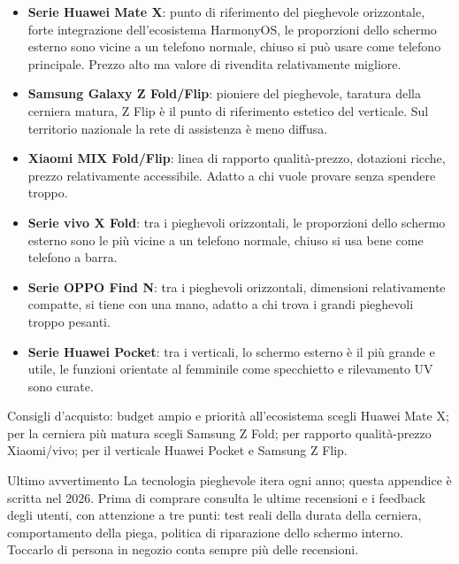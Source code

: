 \begin{itemize}
  \item \textbf{Serie Huawei Mate X}: punto di riferimento del pieghevole orizzontale, forte integrazione dell'ecosistema HarmonyOS, le proporzioni dello schermo esterno sono vicine a un telefono normale, chiuso si può usare come telefono principale. Prezzo alto ma valore di rivendita relativamente migliore.
  \item \textbf{Samsung Galaxy Z Fold/Flip}: pioniere del pieghevole, taratura della cerniera matura, Z Flip è il punto di riferimento estetico del verticale. Sul territorio nazionale la rete di assistenza è meno diffusa.
  \item \textbf{Xiaomi MIX Fold/Flip}: linea di rapporto qualità-prezzo, dotazioni ricche, prezzo relativamente accessibile. Adatto a chi vuole provare senza spendere troppo.
  \item \textbf{Serie vivo X Fold}: tra i pieghevoli orizzontali, le proporzioni dello schermo esterno sono le più vicine a un telefono normale, chiuso si usa bene come telefono a barra.
  \item \textbf{Serie OPPO Find N}: tra i pieghevoli orizzontali, dimensioni relativamente compatte, si tiene con una mano, adatto a chi trova i grandi pieghevoli troppo pesanti.
  \item \textbf{Serie Huawei Pocket}: tra i verticali, lo schermo esterno è il più grande e utile, le funzioni orientate al femminile come specchietto e rilevamento UV sono curate.
\end{itemize}

Consigli d'acquisto: budget ampio e priorità all'ecosistema scegli Huawei Mate X; per la cerniera più matura scegli Samsung Z Fold; per rapporto qualità-prezzo Xiaomi/vivo; per il verticale Huawei Pocket e Samsung Z Flip.

\begin{tcbinfo}{Ultimo avvertimento}
La tecnologia pieghevole itera ogni anno; questa appendice è scritta nel 2026. Prima di comprare consulta le ultime recensioni e i feedback degli utenti, con attenzione a tre punti: test reali della durata della cerniera, comportamento della piega, politica di riparazione dello schermo interno. Toccarlo di persona in negozio conta sempre più delle recensioni.

\end{tcbinfo}
